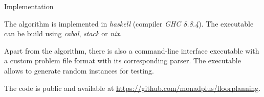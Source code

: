 \documentclass[xcolor=pdftex,dvipsnames,table]{beamer}
\begin{document}
\begin{frame}{Implementation}
  \begin{block}{}
    The algorithm is implemented in \textit{haskell} (compiler \textit{GHC 8.8.4}).
    The executable can be build using \textit{cabal}, \textit{stack} or \textit{nix}.
  \end{block}
  \begin{block}{}
    Apart from the algorithm, there is also a command-line interface executable with a custom problem file format with its corresponding parser.
    The executable allows to generate random instances for testing.
  \end{block}
  \begin{block}{}
    The code is public and available at \url{https://github.com/monadplus/floorplanning}.
  \end{block}
\end{frame}
\end{document}
